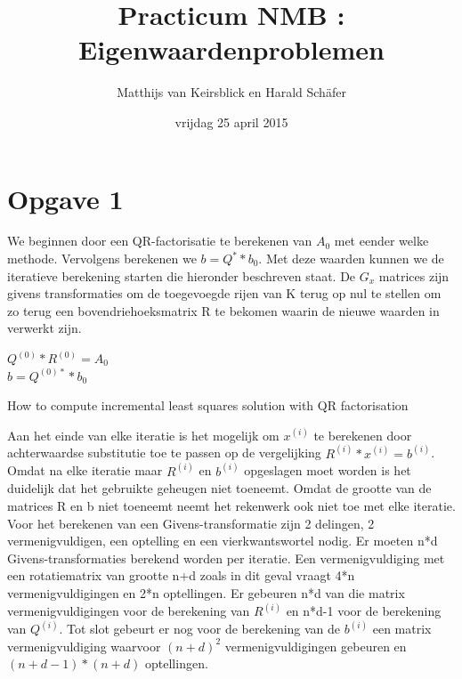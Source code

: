 \documentclass[]{article}
\title{Practicum NMB : Eigenwaardenproblemen}
\author{Matthijs van Keirsblick en Harald Sch\"{a}fer}
\date{vrijdag 25 april 2015}
\newcommand{\opgave}[1]{\pagebreak\section*{Opgave #1}}
\begin{document}
\maketitle
\opgave{1}


We beginnen door een QR-factorisatie te berekenen van $A_{0}$ met eender welke methode. Vervolgens berekenen we $b = Q^{*}*b_{0}$. Met deze waarden kunnen we de iteratieve berekening starten die hieronder beschreven staat. De $G_{x}$ matrices zijn givens transformaties om de toegevoegde rijen van K terug op nul te stellen om zo terug een bovendriehoeksmatrix R te bekomen waarin de nieuwe waarden in verwerkt zijn.


\begin{framed}
\begin{algorithm}[H] 
 $Q^{(0)}*R^{(0)} = A_{0}$\\
 $b = Q^{(0)*}*b_{0}$\\
 
\caption{How to compute incremental least squares solution with QR factorisation}
\end{algorithm}
\end{framed}

\noindent Aan het einde van elke iteratie is het mogelijk om $x^{(i)}$ te berekenen door achterwaardse substitutie toe te passen op de vergelijking $R^{(i)}*x^{(i)} = b^{(i)}$. Omdat na elke iteratie maar $R^{(i)}$ en  $b^{(i)}$ opgeslagen moet worden is het duidelijk dat het gebruikte geheugen niet toeneemt. Omdat de grootte van de matrices R en b niet toeneemt neemt het rekenwerk ook niet toe met elke iteratie. Voor het berekenen van een Givens-transformatie zijn 2 delingen, 2 vermenigvuldigen, een optelling en een vierkwantswortel nodig. Er moeten n*d Givens-transformaties berekend worden per iteratie. Een vermenigvuldiging met een rotatiematrix van grootte n+d zoals in dit geval vraagt 4*n vermenigvuldigingen en 2*n optellingen. Er gebeuren n*d van die matrix vermenigvuldigingen voor de berekening van $R^{(i)}$ en n*d-1 voor de berekening van $Q^{(i)}$. Tot slot  gebeurt er nog voor de berekening van de $b^{(i)}$ een matrix vermenigvuldiging waarvoor $(n+d)^2$ vermenigvuldigingen gebeuren en $(n+d-1)*(n+d)$ optellingen.
\end{document}
